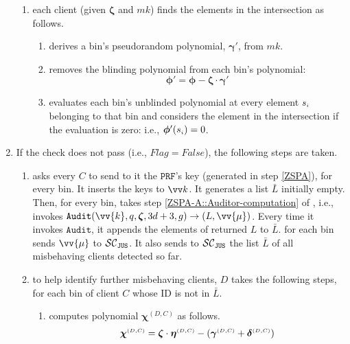 \begin{enumerate}[leftmargin=4mm]
\begin{enumerate}[leftmargin=2mm]
  \item each client (given $\bm\zeta$ and $mk$) finds the elements in the intersection as follows. 
  \begin{enumerate}
  \item derives a bin's pseudorandom polynomial, $\bm\gamma'$, from $mk$. 
  
  \item removes the blinding polynomial from each bin's polynomial: 
  $$\bm\phi'=\bm\phi-\bm\zeta\cdot \bm\gamma'$$ 
  
  \item\label{F-PSI::find-intersection} evaluates each bin's unblinded polynomial at every element $s_{\scriptscriptstyle i}$ belonging to that bin and considers the element in the intersection if the evaluation is zero: i.e., $\bm\phi'(s_{\scriptscriptstyle i})=0$.
 
 \end{enumerate}
 
 
 \end{enumerate}
 
 \item\label{F-PSI::flag-is-false} If the check does not pass (i.e., $Flag=False$), the following steps are taken.
 
 

 
 \begin{enumerate}[leftmargin=2mm]
 

 \item\label{auditor}  \aud asks every  ${  C}$ to send to it the  $\mathtt{PRF}$'s key (generated in step \ref{ZSPA}), for every bin. It inserts the keys to $\vv k$.  It generates a list $\bar L$ initially empty. Then, for every bin,  \aud takes step \ref{ZSPA-A::Auditor-computation} of \zspaa, i.e., invokes  $\mathtt{Audit}( \vv{{k}},  q, \bm\zeta, 3d+3, g)\rightarrow (L, \vv{{\mu}})$.  Every time it invokes $\mathtt{Audit}$, it appends the elements of returned $L$ to $\bar L$.  \aud for each bin sends  $ \vv{{\mu}}$ to $\mathcal{SC}_{\mathtt{JUS}}$. It also sends  to $\mathcal{SC}_{\mathtt{JUS}}$ the list $\bar L$ of all misbehaving clients detected so far.
 

 
 \item to  help identify further  misbehaving clients, $D$ takes the following steps,  for each bin of client $    {  C}$ whose ID is not in $\bar L$.   
 \begin{enumerate}
 \item\label{gen-unmaking-poly} computes polynomial $\bm\chi^{  {  {(D, C)}}}$ as follows. 
 $$\bm\chi^{ \scriptscriptstyle {  {(D, C)}}}=\bm\zeta\cdot \bm\eta^{ \scriptscriptstyle {  {(D,C)}}}-(\bm\gamma^{ \scriptscriptstyle {  {(D,C)}}}+\bm\delta^{ \scriptscriptstyle {  {(D,C)}}})$$
 

\end{enumerate}
\end{enumerate}
\end{enumerate}
